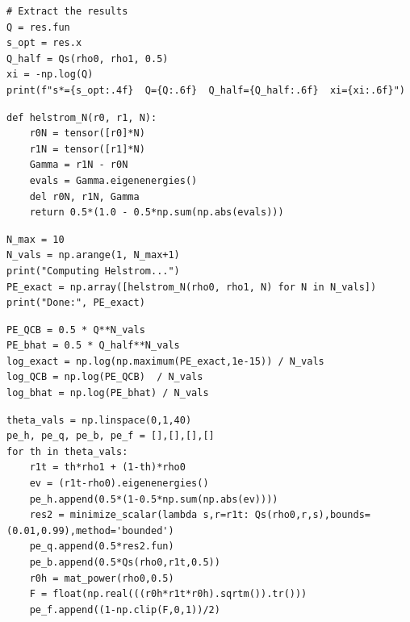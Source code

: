 \begin{lstlisting}[style=pythonstyle, caption={Extracting the results}]
# Extract the results
Q = res.fun
s_opt = res.x
Q_half = Qs(rho0, rho1, 0.5)
xi = -np.log(Q)
print(f"s*={s_opt:.4f}  Q={Q:.6f}  Q_half={Q_half:.6f}  xi={xi:.6f}")
\end{lstlisting}


\begin{lstlisting}[style=pythonstyle, caption={Defining a function to return the N trails accumulated helstrom bounds}]
def helstrom_N(r0, r1, N):
    r0N = tensor([r0]*N)
    r1N = tensor([r1]*N)
    Gamma = r1N - r0N
    evals = Gamma.eigenenergies()
    del r0N, r1N, Gamma
    return 0.5*(1.0 - 0.5*np.sum(np.abs(evals)))
\end{lstlisting}


\begin{lstlisting}[style=pythonstyle, caption={Computing the helstrom bounds}]
N_max = 10
N_vals = np.arange(1, N_max+1)
print("Computing Helstrom...")
PE_exact = np.array([helstrom_N(rho0, rho1, N) for N in N_vals])
print("Done:", PE_exact)
\end{lstlisting}


\begin{lstlisting}[style=pythonstyle, caption={Calculating the probabilities of error}]
PE_QCB = 0.5 * Q**N_vals
PE_bhat = 0.5 * Q_half**N_vals
log_exact = np.log(np.maximum(PE_exact,1e-15)) / N_vals
log_QCB = np.log(PE_QCB)  / N_vals
log_bhat = np.log(PE_bhat) / N_vals
\end{lstlisting}


\begin{lstlisting}[style=pythonstyle, caption={Finding the probability of error for different thetas over different bounds}]
theta_vals = np.linspace(0,1,40)
pe_h, pe_q, pe_b, pe_f = [],[],[],[]
for th in theta_vals:
    r1t = th*rho1 + (1-th)*rho0
    ev = (r1t-rho0).eigenenergies()
    pe_h.append(0.5*(1-0.5*np.sum(np.abs(ev))))
    res2 = minimize_scalar(lambda s,r=r1t: Qs(rho0,r,s),bounds=(0.01,0.99),method='bounded')
    pe_q.append(0.5*res2.fun)
    pe_b.append(0.5*Qs(rho0,r1t,0.5))
    r0h = mat_power(rho0,0.5)
    F = float(np.real(((r0h*r1t*r0h).sqrtm()).tr()))
    pe_f.append((1-np.clip(F,0,1))/2)
\end{lstlisting}



